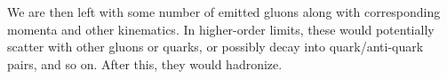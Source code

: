 We are then left with some number of emitted gluons along with corresponding momenta and other kinematics. In higher-order limits, these would potentially scatter with other gluons or quarks, or possibly decay into quark/anti-quark pairs, and so on. After this, they would hadronize.




